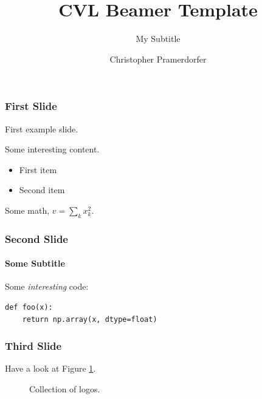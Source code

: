 \documentclass[xetex]{beamer}
\title{CVL Beamer Template}
\subtitle{My Subtitle}
\author{Christopher Pramerdorfer}
\institute{Computer Vision Lab, Vienna University of Technology}
\begin{document}

\begin{frame}
\maketitle
\end{frame}


\begin{frame}
\frametitle{First Slide}

First example slide.

Some interesting content.

\begin{itemize}
    \item First item
    \item Second item
\end{itemize}

Some math, $v=\sum_k x_k^2$.


\end{frame}

\begin{frame}[fragile]
\frametitle{Second Slide}
\framesubtitle{Some Subtitle}

Some \emph{interesting} code:

\begin{verbatim}
def foo(x):
    return np.array(x, dtype=float)
\end{verbatim}

\end{frame}


\begin{frame}
\frametitle{Third Slide}

Have a look at Figure \ref{fig:tuwcvl}.

\begin{figure}
\centering
{} 
\caption{Collection of logos.}
\label{fig:tuwcvl}
\end{figure}

\end{frame}
\end{document}
